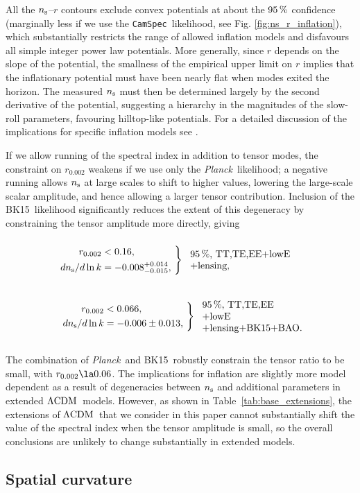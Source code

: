 \documentclass[longauth,traditabstract]{aa}
\def\Planck{\textit{Planck}}
\def\,{\thinspace}
\newcommand{\pbwidth}{4cm}
\newcommand{\leftparbox}[2]{\parbox{#1}{\begin{flushleft} #2 \end{flushleft}}}
\newcommand{\twotwosig}[4][\pbwidth]{
\begin{equation}
\left.
 \begin{aligned}
#2 \\ #3
 \end{aligned}
\ \right\} \ \ \mbox{\text{\leftparbox{#1}{95\,\%,~#4}}}
\end{equation}
}
\newcommand{\camspec}{{\tt CamSpec}}
\newcommand{\mksym}[1]{\ifmmode {\rm #1}\else #1\fi}
\newcommand{\dataplus}{\allowbreak+}
\newcommand{\TTTEEE}{\mksym{TT,TE,EE}}
\newcommand{\lowE}{\mksym{lowE}}
\newcommand{\shortall}{\TTTEEE\dataplus\lowE}
\newcommand{\ns}{n_{\rm s}}
\newcommand{\lcdm}{\texorpdfstring{{$\rm{\Lambda CDM}$}}{ΛCDM}}
\newcommand{\nrun}{d \ns / d\ln k}
\providecommand{\text}[1]{\rm{#1}}
\def\beglet{
  \addtocounter{equation}{1}%
  \setcounter{parentequation}{\value{equation}}%
  \setcounter{equation}{0}%
  \def\theequation{\arabic{parentequation}\alph{equation}}%
  \ignorespaces
}
\def\endlet{
  \setcounter{equation}{\value{parentequation}}%
  \def\theequation{\arabic{equation}}%
}
\providecommand{\beglet}{\begin{subequations}}
\providecommand{\endlet}{\end{subequations}}
\newcommand{\planck}{\Planck}
\newcommand{\BK}{BK15}
\begin{document}
All the  $\ns$--$r$ contours exclude convex potentials at about the $95\,\%$ confidence (marginally less if we use the \camspec\ likelihood, see Fig. \ref{fig:ns_r_inflation}), which substantially restricts the range of allowed inflation models and disfavours all simple integer power law potentials. More generally, since $r$
depends on the slope of the potential, the smallness of the empirical
upper limit on $r$ implies that the inflationary potential must have been nearly flat when modes exited the horizon. The measured $\ns$ must then be determined largely by the second derivative of the potential, suggesting a hierarchy in the magnitudes of the slow-roll parameters, favouring hilltop-like potentials. For a detailed discussion of the implications for specific inflation models see \cite{planck2016-l10}.

If we allow running of the spectral index in addition to tensor modes, the
constraint on $r_{0.002}$ weakens if we use only the \Planck\ likelihood;
a negative running allows $\ns$ at large scales to shift to higher values,
lowering the large-scale scalar amplitude, and hence allowing a larger tensor
contribution.  Inclusion of the \BK\ likelihood significantly reduces the
extent of this degeneracy by constraining the tensor amplitude more directly, giving
\beglet
\twotwosig{r_{0.002} &< 0.16,}{\nrun &= -0.008^{+0.014}_{-0.015},}{\shortall\\+lensing,}
\twotwosig[3.5cm]{r_{0.002} &< 0.066,}{\nrun &=-0.006\pm 0.013,}{\shortall\\+lensing+\BK+BAO.}
\endlet

The combination of \planck\ and \BK\ robustly constrain the tensor ratio to be small, with $r_{0.002}\la 0.06$.
The implications for inflation are slightly more model dependent as a result of
degeneracies between $\ns$ and additional parameters in extended \lcdm\
models. However, as shown in Table~\ref{tab:base_extensions},
the extensions of \lcdm\ that we consider in this paper cannot substantially shift the value of the spectral index when the tensor amplitude is small, so the overall conclusions are unlikely to change substantially in extended models.

\subsection{Spatial curvature}
\label{sec:curv}
\end{document}
